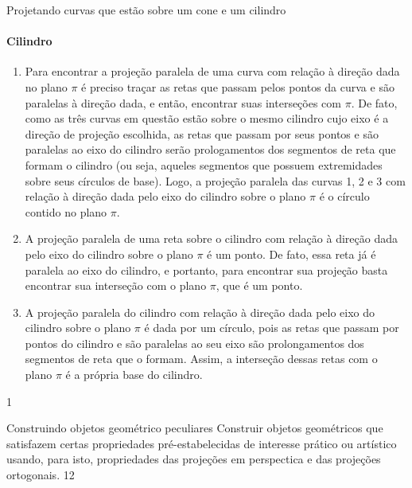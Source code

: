 \begin{answer}{Projetando curvas que estão sobre um cone e um cilindro}
{
\paragraph{Cilindro}
\begin{enumerate}
\item Para encontrar a projeção paralela de uma curva com relação à direção dada no plano \(\pi\) é preciso traçar as retas que passam pelos pontos da curva e são paralelas à direção dada, e então, encontrar suas interseções com \(\pi\). De fato, como as três curvas em questão estão sobre o mesmo cilindro cujo eixo é a direção de projeção escolhida, as retas que passam por seus pontos e são paralelas ao eixo do cilindro serão prologamentos dos segmentos de reta que formam o cilindro (ou seja, aqueles segmentos que possuem extremidades sobre seus círculos de base). Logo, a projeção paralela das curvas 1, 2 e 3 com relação à direção dada pelo eixo do cilindro sobre o plano \(\pi\) é o círculo contido no plano \(\pi\).

\item {} 
A projeção paralela de uma reta sobre o cilindro com relação à direção dada pelo eixo do cilindro sobre o plano \(\pi\) é um ponto. De fato, essa reta já é paralela ao eixo do cilindro, e portanto, para encontrar sua projeção basta encontrar sua interseção com o plano \(\pi\), que é um ponto.

\item {} 
A projeção paralela do cilindro com relação à direção dada pelo eixo do cilindro sobre o plano \(\pi\) é dada por um círculo, pois as retas que passam por pontos do cilindro e são paralelas ao seu eixo são prolongamentos dos segmentos de reta que o formam. Assim, a interseção dessas retas com o plano \(\pi\) é a própria base do cilindro.
\end{enumerate}
}{1}
\end{answer}
\begin{objectives}{Construindo objetos geométrico peculiares}
{
Construir objetos geométricos que satisfazem certas propriedades pré-estabelecidas de interesse prático ou artístico usando, para isto, propriedades das projeções em perspectica e das projeções ortogonais.
}{1}{2}
\end{objectives}
